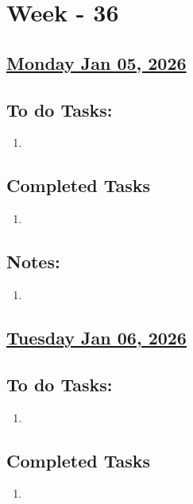 \section{Week - 36}

\subsection*{\underline{Monday Jan 05, 2026}}
\subsection*{To do Tasks:}
\begin{enumerate}
    \item 
\end{enumerate}
\subsection*{Completed Tasks}
\begin{enumerate}[\ding{52}]  %
    \item 
\end{enumerate}
\subsection*{Notes:}
\begin{enumerate}
    \item 
\end{enumerate}
\subsection*{\underline{Tuesday Jan 06, 2026}}
\subsection*{To do Tasks:}
\begin{enumerate}
    \item  
\end{enumerate}
\subsection*{Completed Tasks}
\begin{enumerate}[\ding{52}]  %
    \item 
\end{enumerate}
